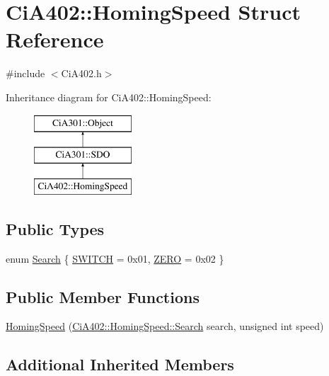 \hypertarget{struct_ci_a402_1_1_homing_speed}{\section{Ci\-A402\-:\-:Homing\-Speed Struct Reference}
\label{struct_ci_a402_1_1_homing_speed}
}


{\ttfamily \#include $<$Ci\-A402.\-h$>$}

Inheritance diagram for Ci\-A402\-:\-:Homing\-Speed\-:\begin{figure}[H]
\begin{center}
\leavevmode
\includegraphics[height=3.000000cm]{d4/d73/struct_ci_a402_1_1_homing_speed}
\end{center}
\end{figure}
\subsection*{Public Types}
\begin{DoxyCompactItemize}
\item 
enum \hyperlink{struct_ci_a402_1_1_homing_speed_a9a10a4d933dcebe91898b7840fac5b94}{Search} \{ \hyperlink{struct_ci_a402_1_1_homing_speed_a9a10a4d933dcebe91898b7840fac5b94a8bda3bac6a07ac2db79c15063670d441}{S\-W\-I\-T\-C\-H} = 0x01, 
\hyperlink{struct_ci_a402_1_1_homing_speed_a9a10a4d933dcebe91898b7840fac5b94a153cc39539c9eec84b0b7fc0304fc507}{Z\-E\-R\-O} = 0x02
 \}
\end{DoxyCompactItemize}
\subsection*{Public Member Functions}
\begin{DoxyCompactItemize}
\item 
\hyperlink{struct_ci_a402_1_1_homing_speed_a26270cd5c1b87a013b247efd29458160}{Homing\-Speed} (\hyperlink{struct_ci_a402_1_1_homing_speed_a9a10a4d933dcebe91898b7840fac5b94}{Ci\-A402\-::\-Homing\-Speed\-::\-Search} search, unsigned int speed)
\end{DoxyCompactItemize}
\subsection*{Additional Inherited Members}


